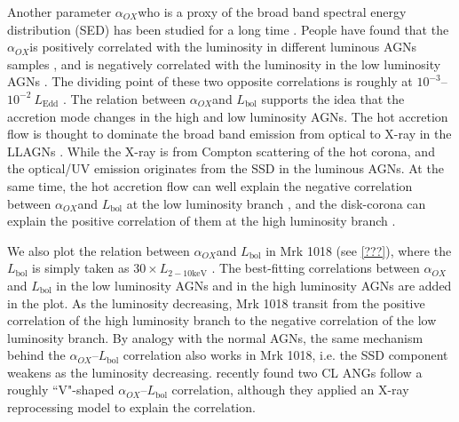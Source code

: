 \documentclass[twocolumn]{aastex63}
\newcommand{\alphaox}{$\alpha_{OX}$}
\begin{document}
Another parameter \alphaox who is a proxy of the broad band spectral energy distribution (SED) has been studied for a long time \citep{Tananbaum1979}. People have found that the \alphaox is positively correlated with the luminosity in different luminous AGNs samples \citep[e.g.][]{Lusso2010,Vagnetti2013,Lusso2016}, and is negatively correlated with the luminosity in the low luminosity AGNs \citep{Xu2011,Li2017}. The dividing point of these two opposite correlations is roughly at $10^{-3}$--$10^{-2}~L_\mathrm{Edd}$ \citep{Xu2011,Li2017}. The relation between \alphaox and $L_\mathrm{bol}$ supports the idea that the accretion mode changes in the high and low luminosity AGNs. The hot accretion flow is thought to dominate the broad band emission from optical to X-ray in the LLAGNs \citep[see reviews in ]{Yuan2014}. While the X-ray is from Compton scattering of the hot corona, and the optical/UV emission originates from the SSD in the luminous AGNs. At the same time, the hot accretion flow can well explain the negative correlation between \alphaox and $L_\mathrm{bol}$ at the low luminosity branch \citep{Xu2011,Li2017}, and the disk-corona can explain the positive correlation of them at the high luminosity branch \citep{Lusso2017,Kubota2018,Arcodia2019}. 

We also plot the relation between \alphaox and $L_\mathrm{bol}$ in Mrk 1018 (see \autoref{???}), where the $L_\mathrm{bol}$ is simply taken as $30\times L_\mathrm{2-10keV}$ \citep{Gu2009}. The best-fitting correlations between \alphaox and $L_\mathrm{bol}$ in the low luminosity AGNs \citep{Xu2011} and in the high luminosity AGNs \citep{Lusso2010} are added in the plot. As the luminosity decreasing, Mrk 1018 transit from the positive correlation of the high luminosity branch to the negative correlation of the low luminosity branch. By analogy with the normal AGNs, the same mechanism behind the \alphaox--$L_\mathrm{bol}$ correlation also works in Mrk 1018, i.e. the SSD component weakens as the luminosity decreasing. \citet{Ruan2019} recently found two CL ANGs follow a roughly ``V"-shaped \alphaox--$L_\mathrm{bol}$ correlation, although they applied an X-ray reprocessing model to explain the correlation. 
\end{document}
